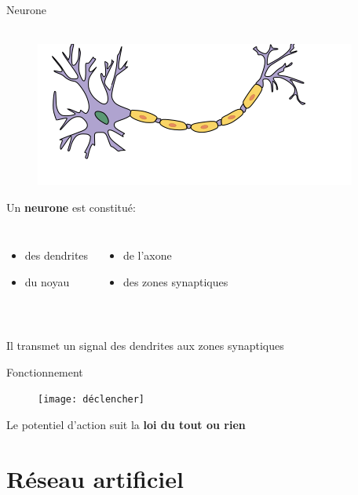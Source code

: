 \documentclass[10pt]{beamer}
\begin{document}
\begin{frame}{Neurone}
	$ $\\$ $
	\begin{figure}
  \includegraphics[scale=0.6]{neuron2}
	\centering
	\end{figure}
	Un \textbf{neurone} est constitu\'e:

  \begin{columns}[T,onlytextwidth]
      \begin{itemize}
        \item des dendrites \item du noyau
      \end{itemize}

      \begin{itemize}
        \item de l'axone \item des zones synaptiques
      \end{itemize}
  \end{columns}
	$ $\\
	Il transmet un signal des dendrites aux zones synaptiques
\end{frame}

{
\begin{frame}{Fonctionnement}
	\begin{figure}
  \texttt{[image: déclencher]}
	\centering
	\end{figure}
	Le potentiel d'action suit la \textbf{loi du tout ou rien}
\end{frame}
}


\section{R\'eseau artificiel}
\end{document}

